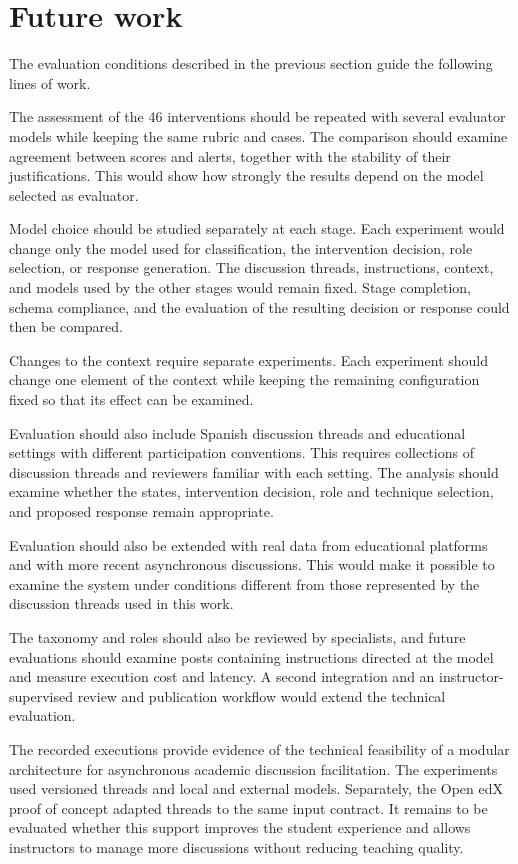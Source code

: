 \section{Future work}

The evaluation conditions described in the previous section guide the following lines of work.

The assessment of the 46 interventions should be repeated with several evaluator models while keeping the same rubric and cases. The comparison should examine agreement between scores and alerts, together with the stability of their justifications. This would show how strongly the results depend on the model selected as evaluator.

Model choice should be studied separately at each stage. Each experiment would change only the model used for classification, the intervention decision, role selection, or response generation. The discussion threads, instructions, context, and models used by the other stages would remain fixed. Stage completion, schema compliance, and the evaluation of the resulting decision or response could then be compared.

Changes to the context require separate experiments. Each experiment should change one element of the context while keeping the remaining configuration fixed so that its effect can be examined.

Evaluation should also include Spanish discussion threads and educational settings with different participation conventions. This requires collections of discussion threads and reviewers familiar with each setting. The analysis should examine whether the states, intervention decision, role and technique selection, and proposed response remain appropriate.

Evaluation should also be extended with real data from educational platforms and with more recent asynchronous discussions. This would make it possible to examine the system under conditions different from those represented by the discussion threads used in this work.

The taxonomy and roles should also be reviewed by specialists, and future evaluations should examine posts containing instructions directed at the model and measure execution cost and latency. A second integration and an instructor-supervised review and publication workflow would extend the technical evaluation.

The recorded executions provide evidence of the technical feasibility of a modular architecture for asynchronous academic discussion facilitation. The experiments used versioned threads and local and external models. Separately, the Open edX proof of concept adapted threads to the same input contract. It remains to be evaluated whether this support improves the student experience and allows instructors to manage more discussions without reducing teaching quality.
